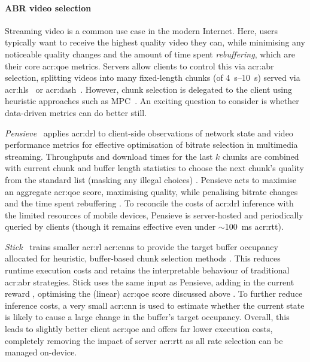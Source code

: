 \paragraph{ABR video selection}
Streaming video is a common use case in the modern Internet.
Here, users typically want to receive the highest quality video they can, while minimising any noticeable quality changes and the amount of time spent \emph{rebuffering}, which are their core \gls{acr:qoe} metrics.
Servers allow clients to control this via \gls{acr:abr} selection, splitting videos into many fixed-length chunks (of \qtyrange{4}{10}{\second}) served via \gls{acr:hls}~\parencite{rfc8216} or \gls{acr:dash}~\parencite{mpeg-dash}.
However, chunk selection is delegated to the client using heuristic approaches such as MPC~\parencite{DBLP:conf/sigcomm/YinJSS15}. 
An exciting question to consider is whether data-driven metrics can do better still.

\emph{Pensieve}~\parencite{DBLP:conf/sigcomm/MaoNA17} applies \gls{acr:drl} to client-side observations of network state and video performance metrics for effective optimisation of bitrate selection in multimedia streaming.
Throughputs and download times for the last $k$ chunks are combined with current chunk and buffer length statistics \prllitstate{} to choose the next chunk's quality from the standard list (masking any illegal choices) \prllitact{}.
Pensieve acts to maximise an aggregate \gls{acr:qoe} score, maximising quality, while penalising bitrate changes and the time spent rebuffering \prllitreward{}.
To reconcile the costs of \gls{acr:drl} inference with the limited resources of mobile devices, Pensieve is server-hosted and periodically queried by clients (though it remains effective even under $\sim$\qty{100}{\milli\second} \gls{acr:rtt}).

\emph{Stick}~\parencite{DBLP:conf/infocom/HuangZZW0S20} trains smaller \gls{acr:rl} \glspl{acr:cnn} to provide the target buffer occupancy allocated for heuristic, buffer-based chunk selection methods \prllitactreal{}.
This reduces runtime execution costs and retains the interpretable behaviour of traditional \gls{acr:abr} strategies.
Stick uses the same input as Pensieve, adding in the current reward \prllitstate{}, optimising the (linear) \gls{acr:qoe} score discussed above \prllitreward{}.
To further reduce inference costs, a very small \gls{acr:cnn} is used to estimate whether the current state is likely to cause a large change in the buffer's target occupancy.
Overall, this leads to slightly better client \gls{acr:qoe} and offers far lower execution costs, completely removing the impact of server \gls{acr:rtt} as all rate selection can be managed on-device.

